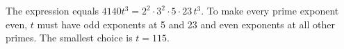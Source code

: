 The expression equals $4140t^3=2^2\cdot3^2\cdot5\cdot23\,t^3$. To make every prime exponent even, $t$ must have odd exponents at 5 and 23 and even exponents at all other primes. The smallest choice is $\boxed{t=115}$.
